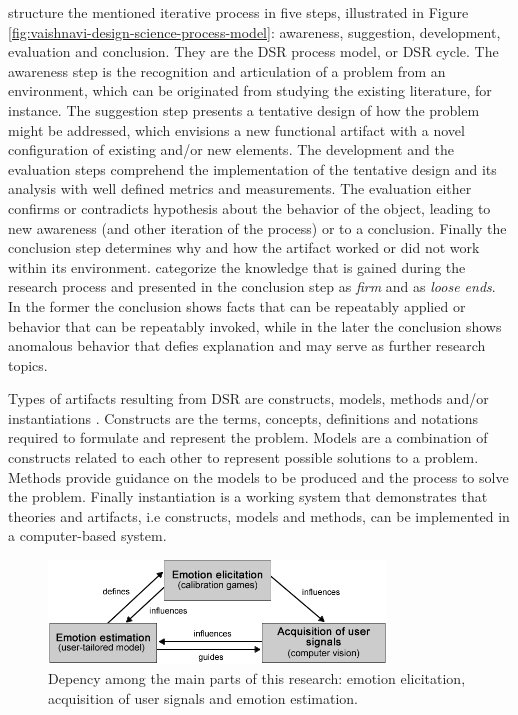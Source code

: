 \textcite{vaishnavi2015design} structure the mentioned iterative process in five steps, illustrated in Figure \ref{fig:vaishnavi-design-science-process-model}: awareness, suggestion, development, evaluation and conclusion. They are the DSR process model, or DSR cycle. The awareness step is the recognition and articulation of a problem from an environment, which can be originated from studying the existing literature, for instance. The suggestion step presents a tentative design of how the problem might be addressed, which envisions a new functional artifact with a novel configuration of existing and/or new elements. The development and the evaluation steps comprehend the implementation of the tentative design and its analysis with well defined metrics and measurements. The evaluation either confirms or contradicts hypothesis about the behavior of the object, leading to new awareness (and other iteration of the process) or to a conclusion. Finally the conclusion step determines why and how the artifact worked or did not work within its environment. \textcite{vaishnavi2015design} categorize the knowledge that is gained during the research process and presented in the conclusion step as \textit{firm} and as \textit{loose ends}. In the former the conclusion shows facts that can be repeatably applied or behavior that can be repeatably invoked, while in the later the conclusion shows anomalous behavior that defies explanation and may serve as further research topics.

Types of artifacts resulting from DSR are constructs, models, methods and/or instantiations \parencite{oates2005researching,johannesson2014introduction}. Constructs are the terms, concepts, definitions and notations required to formulate and represent the problem. Models are a combination of constructs related to each other to represent possible solutions to a problem. Methods provide guidance on the models to be produced and the process to solve the problem. Finally instantiation is a working system that demonstrates that theories and artifacts, i.e constructs, models and methods, can be implemented in a computer-based system.

\begin{figure}[h]
    \centering
    \includegraphics[width=0.8\textwidth]{Content/figures/method-components-dependency.png}
    \caption{Depency among the main parts of this research: emotion elicitation, acquisition of user signals and emotion estimation.}
    \label{fig:method-components-dependency}
\end{figure}

